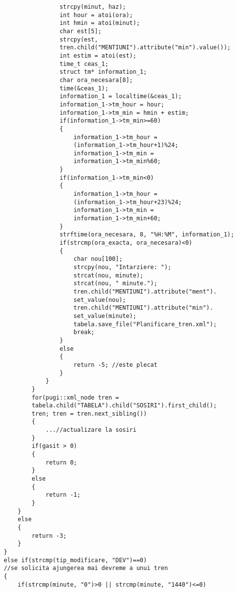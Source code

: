 \documentclass[runningheads]{llncs}
\begin{document}
\begin{verbatim}
                    strcpy(minut, haz);
                    int hour = atoi(ora);
                    int hmin = atoi(minut);
                    char est[5];
                    strcpy(est, 
                    tren.child("MENTIUNI").attribute("min").value());
                    int estim = atoi(est);
                    time_t ceas_1;
                    struct tm* information_1;
                    char ora_necesara[8];
                    time(&ceas_1);
                    information_1 = localtime(&ceas_1);
                    information_1->tm_hour = hour;
                    information_1->tm_min = hmin + estim;
                    if(information_1->tm_min>=60)
                    {
                        information_1->tm_hour = 
                        (information_1->tm_hour+1)%24;
                        information_1->tm_min = 
                        information_1->tm_min%60;
                    }
                    if(information_1->tm_min<0)
                    {
                        information_1->tm_hour = 
                        (information_1->tm_hour+23)%24;
                        information_1->tm_min = 
                        information_1->tm_min+60;
                    }
                    strftime(ora_necesara, 8, "%H:%M", information_1);
                    if(strcmp(ora_exacta, ora_necesara)<0)
                    {
                        char nou[100];
                        strcpy(nou, "Intarziere: ");
                        strcat(nou, minute);
                        strcat(nou, " minute.");
                        tren.child("MENTIUNI").attribute("ment").
                        set_value(nou);
                        tren.child("MENTIUNI").attribute("min").
                        set_value(minute);
                        tabela.save_file("Planificare_tren.xml");
                        break;
                    }
                    else
                    {
                        return -5; //este plecat
                    }
                }
            }
            for(pugi::xml_node tren = 
            tabela.child("TABELA").child("SOSIRI").first_child(); 
            tren; tren = tren.next_sibling())
            {
                ...//actualizare la sosiri
            }
            if(gasit > 0)
            {
                return 0;
            }
            else
            {
                return -1;
            }
        }
        else
        {
            return -3;
        }
    }
    else if(strcmp(tip_modificare, "DEV")==0)
    //se solicita ajungerea mai devreme a unui tren
    {
        if(strcmp(minute, "0")>0 || strcmp(minute, "1440")<=0)

\end{verbatim}
\end{document}
